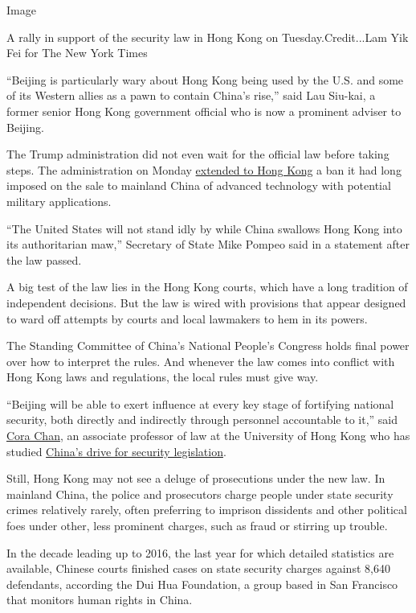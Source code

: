 Image

A rally in support of the security law in Hong Kong on
Tuesday.Credit...Lam Yik Fei for The New York Times

``Beijing is particularly wary about Hong Kong being used by the U.S.
and some of its Western allies as a pawn to contain China's rise,'' said
Lau Siu-kai, a former senior Hong Kong government official who is now a
prominent adviser to Beijing.

The Trump administration did not even wait for the official law before
taking steps. The administration on Monday
\href{https://www.nytimes3xbfgragh.onion/2020/06/29/business/economy/us-halts-high-tech-exports-hong-kong.html}{extended
to Hong Kong} a ban it had long imposed on the sale to mainland China of
advanced technology with potential military applications.

``The United States will not stand idly by while China swallows Hong
Kong into its authoritarian maw,'' Secretary of State Mike Pompeo said
in a statement after the law passed.

A big test of the law lies in the Hong Kong courts, which have a long
tradition of independent decisions. But the law is wired with provisions
that appear designed to ward off attempts by courts and local lawmakers
to hem in its powers.

The Standing Committee of China's National People's Congress holds final
power over how to interpret the rules. And whenever the law comes into
conflict with Hong Kong laws and regulations, the local rules must give
way.

``Beijing will be able to exert influence at every key stage of
fortifying national security, both directly and indirectly through
personnel accountable to it,'' said
\href{https://www.law.hku.hk/academic_staff/cora-chan/}{Cora Chan}, an
associate professor of law at the University of Hong Kong who has
studied
\href{https://www.bloomsburyprofessional.com/uk/chinas-national-security-9781509928156/}{China's
drive for security legislation}.

Still, Hong Kong may not see a deluge of prosecutions under the new law.
In mainland China, the police and prosecutors charge people under state
security crimes relatively rarely, often preferring to imprison
dissidents and other political foes under other, less prominent charges,
such as fraud or stirring up trouble.

In the decade leading up to 2016, the last year for which detailed
statistics are available, Chinese courts finished cases on state
security charges against 8,640 defendants, according the Dui Hua
Foundation, a group based in San Francisco that monitors human rights in
China.

